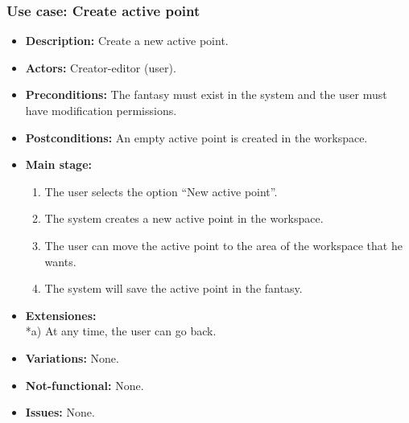 \subsubsection{Use case: Create active point}
\begin{itemize}
	\item \textbf{Description:} Create a new active point.
	\item \textbf{Actors:} Creator-editor (user).
	\item \textbf{Preconditions:} The fantasy must exist in the system and the user must have modification permissions.
	\item \textbf{Postconditions:} An empty active point is created in the workspace.
	\item \textbf{Main stage:}
	\begin{enumerate}
		\item The user selects the option ``New active point''.
		\item The system creates a new active point in the workspace.
		\item The user can move the active point to the area of the workspace that he wants.
		\item The system will save the active point in the fantasy.
	\end{enumerate}
	\item \textbf{Extensiones:} \\ *a) At any time, the user can go back.
	\item \textbf{Variations:} None.
	\item \textbf{Not-functional:} None.
	\item \textbf{Issues:} None.
\end{itemize}

